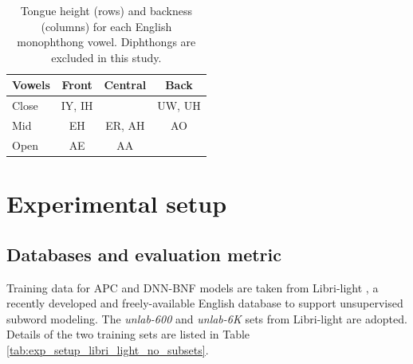 \documentclass[transmag]{IEEEtran}
\begin{document}
\begin{table}[!t]
\centering
\renewcommand\arraystretch{0.5}
\caption{Tongue height (rows) and backness (columns) for each English monophthong vowel. Diphthongs are excluded in this study.}
\begin{tabular}{l|ccc}
\toprule
\textbf{Vowels} & Front & Central & Back\\ 
\midrule
Close    & IY, IH & &  UW, UH   \\
Mid &EH &ER, AH &AO\\
Open &AE &AA &\\
\bottomrule
\end{tabular}
\label{table:AF_backness_height}
\end{table}

\section{Experimental setup}
\label{sec:exp_setup}
\subsection{Databases and evaluation metric}
Training data for APC and DNN-BNF models are taken from Libri-light \cite{kahn2019librilight}, a recently developed and freely-available English database to support unsupervised subword modeling. The \textit{unlab-600} and \textit{unlab-6K} sets from Libri-light are adopted. Details of the two training sets are listed in Table   \ref{tab:exp_setup_libri_light_no_subsets}. 
\end{document}
